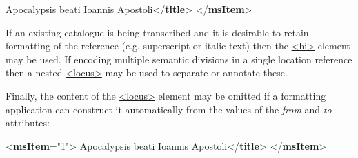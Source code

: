 \begin{shaded}
\mbox{}\newline 
{}Apocalypsis beati Ioannis Apostoli{</\textbf{title}>}\mbox{}\newline 
{</\textbf{msItem}>}\end{shaded}\egroup\par \noindent  If an existing catalogue is being transcribed and it is desirable to retain formatting of the reference (e.g. superscript or italic text) then the \hyperref[TEI.hi]{<hi>} element may be used. If encoding multiple semantic divisions in a single location reference then a nested \hyperref[TEI.locus]{<locus>} may be used to separate or annotate these.\par
Finally, the content of the \hyperref[TEI.locus]{<locus>} element may be omitted if a formatting application can construct it automatically from the values of the {\itshape from} and {\itshape to} attributes: \par\bgroup{}\exampleFont \begin{shaded}\noindent\mbox{}{<\textbf{msItem}\hspace*{1em}{n}="{1}">}\mbox{}\newline 
{}\mbox{}\newline 
\hspace*{1em}\mbox{}\newline 
\hspace*{1em}\mbox{}\newline 
{}\mbox{}\newline 
{}Apocalypsis beati Ioannis Apostoli{</\textbf{title}>}\mbox{}\newline 
{</\textbf{msItem}>}\end{shaded}\egroup\par 
